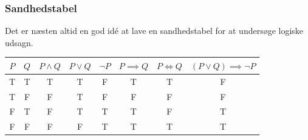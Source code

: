 \subsubsection{Sandhedstabel}
Det er næsten altid en god idé at lave en sandhedstabel for at undersøge logiske udsagn.

\begin{table}[h]
    \centering
    \begin{tabular}{|c|c|c|c|c|c|c|c|}
        \hline
        $P$ & $Q$ & $P \land Q$ & $P \lor Q$ & $\lnot P$ & $P \implies Q$ & $P \iff Q$ & $(P \lor Q) \implies \neg P$ \\
        \hline
        T & T & T & T & F & T & T & F \\
        T & F & F & T & F & F & F & F \\
        F & T & F & T & T & T & F & T \\
        F & F & F & F & T & T & T & T \\
        \hline
    \end{tabular}
\end{table}